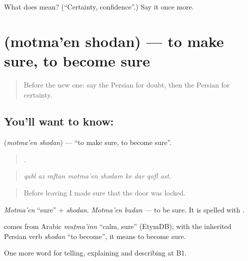 \begin{tcolorbox}[breakable,colback=teal!4,colframe=teal!35!black,title={Before you move on}]
What does  mean? (\textquotedblleft{}Certainty, confidence\textquotedblright{}.) Say it once more.
\end{tcolorbox}
\section[\texorpdfstring{\fa{مطمئن} \fa{شدن} (motma'en shodan)}{مطمئن شدن (motma'en shodan)}]{  (motma'en shodan) — to make sure, to become sure}

\label{lesson:FA-C393-motmaen-shodan}



\begin{quote}
Before the new one: say the Persian for doubt, then the Persian for certainty.
\end{quote}

\subsection*{You'll want to know:  }
\textbf{ } (\emph{motma'en shodan}) — \textquotedblleft{}to make sure, to become sure\textquotedblright{}.

\begin{quote}
        .
\end{quote}

\begin{quote}
\emph{qabl az raftan motma'en shodam ke dar qofl ast.}
\end{quote}

\begin{quote}
Before leaving I made sure that the door was locked.
\end{quote}

\emph{Motma'en} \textquotedblleft{}sure\textquotedblright{} + \emph{shodan}. \emph{Motma'en budan} — to be sure. It is spelled with .

\begin{cousinweb}
\textbf{} comes from Arabic \emph{muṭma'inn} \textquotedblleft{}calm, sure\textquotedblright{} (EtymDB); with the inherited Persian verb \emph{shodan} \textquotedblleft{}to become\textquotedblright{}, it means to become sure.
\end{cousinweb}

\begin{grammarlens}[title={What you've built}]
One more word for telling, explaining and describing at B1.
\end{grammarlens}

